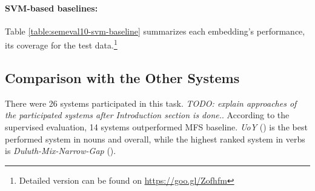 \paragraph{SVM-based baselines:} Table \ref{table:semeval10-svm-baseline} summarizes each embedding's performance, its coverage for the test data.\footnote{Detailed version can be found on \href{https://goo.gl/Zofhfm}{https://goo.gl/Zofhfm}}










\subsection{Comparison with the Other Systems}

There were 26 systems participated in this task. \emph{TODO: explain approaches of the participated systems after Introduction section is done.}. According to the supervised evaluation, 14 systems outperformed MFS baseline. \emph{UoY} (\cite{korkontzelos10uoy}) is the best performed system in nouns and overall, while the highest ranked system in verbs is \emph{Duluth-Mix-Narrow-Gap} (\cite{pedersen10duluth}).